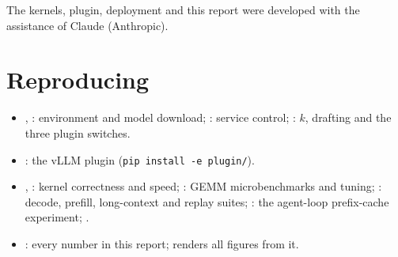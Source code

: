 \documentclass[acmtog,nonacm,screen]{acmart}
\begin{document}
\begin{acks}
The kernels, plugin, deployment and this report were developed with the assistance of Claude (Anthropic).
\end{acks}




\appendix
\section{Reproducing}
\begin{itemize}\raggedright
\item {}, : environment and model download; :
service control; : $k$, drafting and the three plugin switches.
\item {}: the  vLLM plugin (\texttt{pip install -e plugin/}).
\item {}, : kernel correctness and speed;
: GEMM microbenchmarks and tuning; : decode, prefill, long-context and
replay suites; : the agent-loop prefix-cache experiment; .
\item {}: every number in this report;  renders
all figures from it.
\end{itemize}
\end{document}
